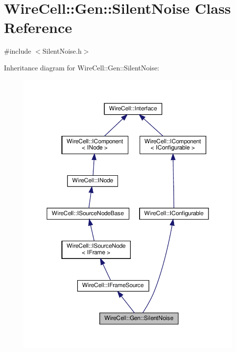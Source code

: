 \hypertarget{class_wire_cell_1_1_gen_1_1_silent_noise}{}\section{Wire\+Cell\+:\+:Gen\+:\+:Silent\+Noise Class Reference}
\label{class_wire_cell_1_1_gen_1_1_silent_noise}


{\ttfamily \#include $<$Silent\+Noise.\+h$>$}



Inheritance diagram for Wire\+Cell\+:\+:Gen\+:\+:Silent\+Noise\+:
\nopagebreak
\begin{figure}[H]
\begin{center}
\leavevmode
\includegraphics[width=350pt]{class_wire_cell_1_1_gen_1_1_silent_noise__inherit__graph}
\end{center}
\end{figure}


